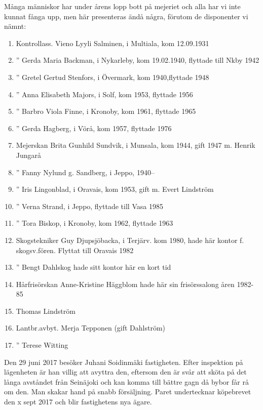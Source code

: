 Många människor har under årens lopp  bott på mejeriet och alla har vi inte kunnat fånga upp, men här presenteras ändå några, förutom de disponenter vi nämnt:
\begin{enumerate}
  \item Kontrollass.  Vieno Lyyli Salminen,  i Multiala, kom 12.09.1931
  \item     ''        Gerda Maria Backman,  i Nykarleby, kom 19.02.1940, flyttade till Nkby 1942
  \item     ''        Gretel Gertud Stenfors,  i Övermark, kom 1940,flyttade 1948
  \item     ''        Anna Elisabeth Majors,  i Solf, kom 1953, flyttade 1956
  \item     ''        Barbro Viola Finne,  i Kronoby, kom 1961, flyttade 1965
  \item     ''        Gerda Hagberg,  i Vörå, kom 1957, flyttade 1976
  \item Mejerskan     Brita Gunhild Sundvik,  i Munsala, kom 1944, gift 1947 m. Henrik Jungarå
  \item     ''        Fanny Nylund g. Sandberg,  i Jeppo, 1940--
  \item     ''        Iris Lingonblad,  i Oravais, kom 1953, gift m. Evert Lindström
  \item     ''        Verna Strand,   i Jeppo, flyttade till Vasa 1985
  \item     ''        Tora Biskop,   i  Kronoby, kom 1962, flyttade 1963
  \item Skogstekniker Guy Djupsjöbacka,  i Terjärv. kom 1980, hade här kontor f. skogsv.fören. Flyttat till Oravais 1982
  \item     ''        Bengt Dahlskog hade sitt kontor här en kort tid
  \item Hårfrisörskan Anne-Kristine Häggblom hade här sin frisörssalong åren 1982-85
  \item Thomas Lindström
  \item Lantbr.avbyt. Merja Tepponen (gift Dahlström)
  \item     ''        Terese Witting
\end{enumerate}





Den 29 juni 2017 besöker Juhani Soidinmäki fastigheten. Efter inspektion på lägenheten är han villig att avyttra den, eftersom den är svår att sköta på det långa avståndet från Seinäjoki och kan komma till bättre gagn då bybor får rå om den. Man skakar hand på snabb försäljning. Paret undertecknar köpebrevet den x sept 2017 och blir fastighetens nya ägare.



